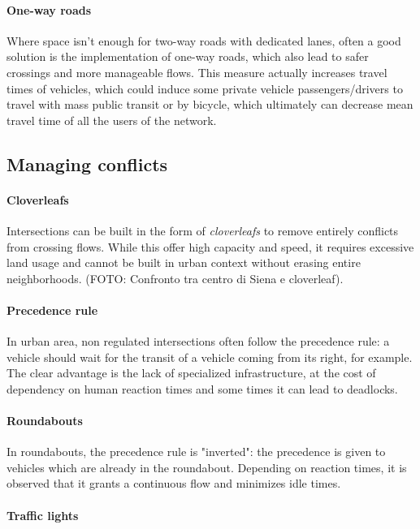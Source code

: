 \paragraph{One-way roads}

Where space isn't enough for two-way roads with dedicated lanes, often a good solution is the implementation of one-way roads, which also lead to safer crossings and more manageable flows. This measure actually increases travel times of vehicles, which could induce some private vehicle passengers/drivers to travel with mass public transit or by bicycle, which ultimately can decrease mean travel time of all the users of the network.

\subsection{Managing conflicts}

\paragraph{Cloverleafs}

Intersections can be built in the form of \textit{cloverleafs} to remove entirely conflicts from crossing flows. While this offer high capacity and speed, it requires excessive land usage and cannot be built in urban context without erasing entire neighborhoods. (FOTO: Confronto tra centro di Siena e cloverleaf).

\paragraph{Precedence rule}

In urban area, non regulated intersections often follow the precedence rule: a vehicle should wait for the transit of a vehicle coming from its right, for example. The clear advantage is the lack of specialized infrastructure, at the cost of dependency on human reaction times and some times it can lead to deadlocks.

\paragraph{Roundabouts}

In roundabouts, the precedence rule is "inverted": the precedence is given to vehicles which are already in the roundabout. Depending on reaction times, it is observed that it grants a continuous flow and minimizes idle times.

\paragraph{Traffic lights}


